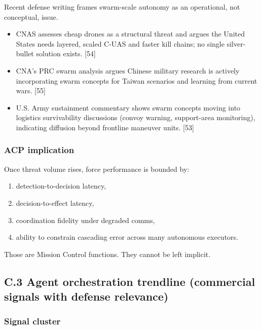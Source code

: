 \documentclass[
]{article}
\providecommand{\tightlist}{%
  \setlength{\itemsep}{0pt}\setlength{\parskip}{0pt}}
\begin{document}
Recent defense writing frames swarm-scale autonomy as an operational,
not conceptual, issue.

\begin{itemize}
\tightlist
\item
  CNAS assesses cheap drones as a structural threat and argues the
  United States needs layered, scaled C-UAS and faster kill chains; no
  single silver-bullet solution exists. {[}54{]}
\item
  CNA's PRC swarm analysis argues Chinese military research is actively
  incorporating swarm concepts for Taiwan scenarios and learning from
  current wars. {[}55{]}
\item
  U.S. Army sustainment commentary shows swarm concepts moving into
  logistics survivability discussions (convoy warning, support-area
  monitoring), indicating diffusion beyond frontline maneuver units.
  {[}53{]}
\end{itemize}

\hypertarget{acp-implication-1}{%
\subsubsection{ACP implication}\label{acp-implication-1}}

Once threat volume rises, force performance is bounded by:

\begin{enumerate}
\def\labelenumi{\arabic{enumi}.}
\tightlist
\item
  detection-to-decision latency,
\item
  decision-to-effect latency,
\item
  coordination fidelity under degraded comms,
\item
  ability to constrain cascading error across many autonomous executors.
\end{enumerate}

Those are Mission Control functions. They cannot be left implicit.

\hypertarget{c.3-agent-orchestration-trendline-commercial-signals-with-defense-relevance}{%
\subsection{C.3 Agent orchestration trendline (commercial signals with
defense
relevance)}\label{c.3-agent-orchestration-trendline-commercial-signals-with-defense-relevance}}

\hypertarget{signal-cluster}{%
\subsubsection{Signal cluster}\label{signal-cluster}}
\end{document}
